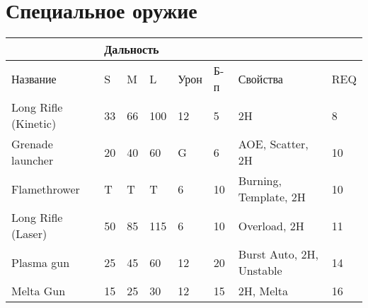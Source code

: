         \section*{Специальное оружие}
        \begin{table}[H]
            \centering
            \begin{tabular}{|l|lll|l|l|l|l|}
            \hline
                                 & \multicolumn{3}{l|}{Дальность}                          &      &     &                          &     \\ \hline
            Название             & \multicolumn{1}{l|}{S}  & \multicolumn{1}{l|}{M}  & L   & Урон & Б-п & Свойства                 & REQ \\ \hline
            Long Rifle (Kinetic) & \multicolumn{1}{l|}{33} & \multicolumn{1}{l|}{66} & 100 & 12   & 5   & 2H                       & 8   \\ \hline
            Grenade launcher     & \multicolumn{1}{l|}{20} & \multicolumn{1}{l|}{40} & 60  & G    & 6   & AOE, Scatter, 2H         & 10  \\ \hline
            Flamethrower         & \multicolumn{1}{l|}{T}  & \multicolumn{1}{l|}{T}  & T   & 6    & 10  & Burning, Template, 2H    & 10  \\ \hline
            Long Rifle (Laser)   & \multicolumn{1}{l|}{50} & \multicolumn{1}{l|}{85} & 115 & 6    & 10  & Overload, 2H             & 11  \\ \hline
            Plasma gun           & \multicolumn{1}{l|}{25} & \multicolumn{1}{l|}{45} & 60  & 12   & 20  & Burst Auto, 2H, Unstable & 14  \\ \hline
            Melta Gun            & \multicolumn{1}{l|}{15} & \multicolumn{1}{l|}{25} & 30  & 12   & 15  & 2H, Melta                & 16  \\ \hline
            \end{tabular}
            \end{table}

